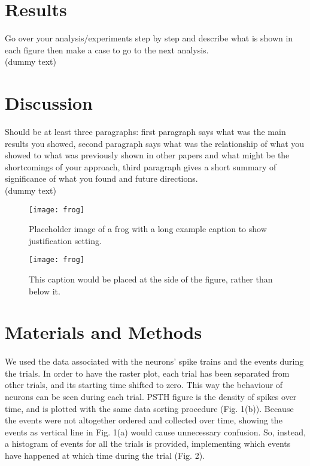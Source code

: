 \documentclass[9pt,twocolumn]{paper-template}
\begin{document}
\section*{Results}
Go over your analysis/experiments step by step and
describe what is shown in each figure then make a case
to go to the next analysis.\\

(dummy text)\lipsum[1]

\section*{Discussion}
Should be at least three paragraphs: first paragraph says what
was the main results you showed, second paragraph says
what was the relationship of what you showed to what
was previously shown in other papers and what might
be the shortcomings of your approach, third paragraph
gives a short summary of significance of what you found
and future directions.\\

(dummy text)\lipsum[1]

\begin{figure}%
\centering
\texttt{[image: frog]}
\caption{Placeholder image of a frog with a long example caption to show justification setting.}
\label{fig:frog}
\end{figure}


\begin{SCfigure*}[\sidecaptionrelwidth][t]
\centering
\texttt{[image: frog]}
\caption{This caption would be placed at the side of the figure, rather than below it.}\label{fig:side}
\end{SCfigure*}

\section*{Materials and Methods}
\paragraph*{} 
We used the data associated with the neurons' spike trains and the events during the trials. In order to have the raster plot, each trial has been separated from other trials, and its starting time shifted to zero. This way the behaviour of neurons can be seen during each trial. PSTH figure is the density of spikes over time, and is plotted with the same data sorting procedure (Fig. 1(b)). Because the events were not altogether ordered and collected over time, showing the events as vertical line in Fig. 1(a) would cause unnecessary confusion. So, instead, a histogram of events for all the trials is provided, implementing which events have happened at which time during the trial (Fig. 2).
\end{document}
